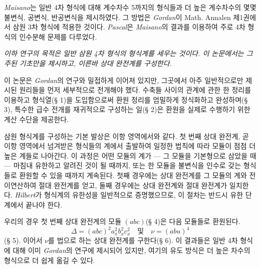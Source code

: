 \emph{Maisano}는 일반 4차 형식에 대해 계수차수 5까지의 형식들과 더 높은 계수차수의 몇몇 불변식, 공변식, 반공변식을 제시하였다. 그 방법은 \emph{Gordan}이 Math. Annalen 제1권에서 삼원 3차 형식에 적용한 것이다. \emph{Pascal}은 \emph{Maisano}의 결과를 이용하여 주로 4차 형식의 인수분해 문제를 다루었다.

\emph{이하 연구의 목적은 일반 삼원 4차 형식의 형식계를 세우는 것이다. 이 논문에서는 그 주된 기초만을 제시하고, 이른바 \glqq{}상대 완전계\grqq{}}\emph{를 구성한다.}

이 논문은 \emph{Gordan}의 연구와 밀접하게 이어져 있지만, 그곳에서 아주 일반적으로만 제시된 원리들을 먼저 세부적으로 전개해야 했다. 수축들 사이의 관계에 관한 한 정리를 이용하고 \glqq{}형식열\grqq{}(§ 1)을 도입함으로써 환원 정리를 엄밀하게 정식화하고 완성하며(§ 3), 특수한 급수 전개를 재귀적으로 구성하는 일(§ 2)은 환원을 실제로 수행하기 위한 계산 수단을 제공한다.

삼원 형식계를 구성하는 기본 발상은 이항 영역에서와 같다. 첫 번째 상대 완전계, 곧 이항 영역에서 넘겨받은 형식들의 계에서 출발하여 일정한 법칙에 따라 모듈이 점점 더 높은 계들로 나아간다. 이 과정은 어떤 모듈의 계가 --- 그 모듈을 기본형으로 삼았을 때 --- 마침내 유한하고 알려진 것이 될 때까지, 또는 한 모듈을 불변식을 인수로 갖는 형식들로 환원할 수 있을 때까지 계속된다. 첫째 경우에는 상대 완전계를 그 모듈의 계와 전이연산하여 절대 완전계를 얻고, 둘째 경우에는 상대 완전계와 절대 완전계가 일치한다. \emph{Hilbert}가 형식계의 유한성을 일반적으로 증명했으므로, 이 절차는 반드시 유한 단계에서 끝나야 한다.

우리의 경우 첫 번째 상대 완전계의 모듈 $(abc)$(§ 4)은 다음 모듈들로 환원된다.
\[
\Delta=(abc)^2a_x^2b_x^2c_x^2\quad\text{및}\quad \nu=(abu)^4
\]
(§ 5). 이어서 $\nu$를 법으로 하는 상대 완전계를 구한다(§ 6). 이 결과들은 일반 4차 형식에 대해 이미 \emph{Gordan}의 연구에 제시되어 있지만, 여기의 유도 방식은 더 높은 차수의 형식으로 더 쉽게 옮길 수 있다.

